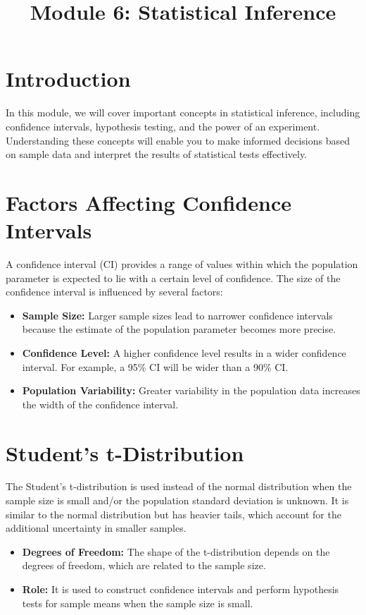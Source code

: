 \documentclass{article}
\begin{document}
\title{Module 6: Statistical Inference}
\author{}
\date{}
\maketitle

\section{Introduction}
In this module, we will cover important concepts in statistical inference, including confidence intervals, hypothesis testing, and the power of an experiment. Understanding these concepts will enable you to make informed decisions based on sample data and interpret the results of statistical tests effectively.

\section{Factors Affecting Confidence Intervals}
A confidence interval (CI) provides a range of values within which the population parameter is expected to lie with a certain level of confidence. The size of the confidence interval is influenced by several factors:

\begin{itemize}
    \item \textbf{Sample Size:} Larger sample sizes lead to narrower confidence intervals because the estimate of the population parameter becomes more precise.
    \item \textbf{Confidence Level:} A higher confidence level results in a wider confidence interval. For example, a 95\% CI will be wider than a 90\% CI.
    \item \textbf{Population Variability:} Greater variability in the population data increases the width of the confidence interval.
\end{itemize}

\section{Student's t-Distribution}
The Student's t-distribution is used instead of the normal distribution when the sample size is small and/or the population standard deviation is unknown. It is similar to the normal distribution but has heavier tails, which account for the additional uncertainty in smaller samples.

\begin{itemize}
    \item \textbf{Degrees of Freedom:} The shape of the t-distribution depends on the degrees of freedom, which are related to the sample size.
    \item \textbf{Role:} It is used to construct confidence intervals and perform hypothesis tests for sample means when the sample size is small.
\end{itemize}
\end{document}

